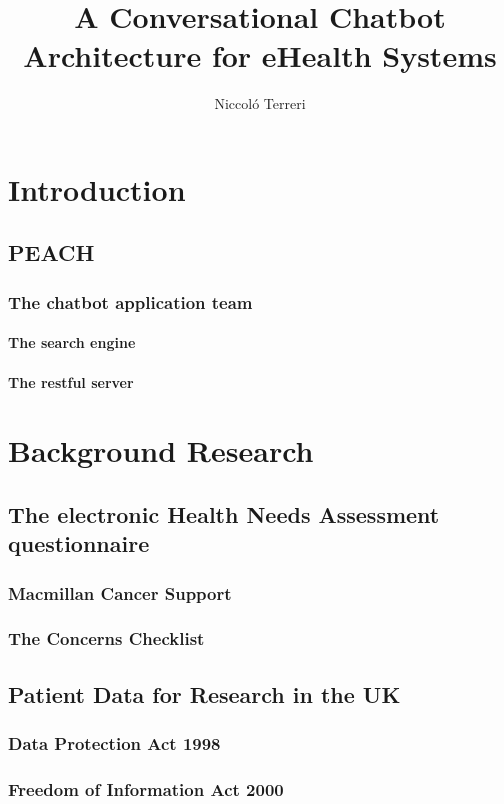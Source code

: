 \documentclass[12pt, twoside, a4paper, draft]{report}
\author{Niccol\'o Terreri}
\title{A Conversational Chatbot Architecture for eHealth Systems}
\begin{document}
\maketitle
\tableofcontents

\chapter{Introduction}
\section{PEACH}
\subsection{The chatbot application team}
\subsubsection{The search engine}
\subsubsection{The restful server}

\chapter{Background Research}
\section{The electronic Health Needs Assessment questionnaire}
\subsection{Macmillan Cancer Support}
\subsection{The Concerns Checklist}
\section{Patient Data for Research in the UK}
\subsection{Data Protection Act 1998}
\subsection{Freedom of Information Act 2000}
\end{document}
